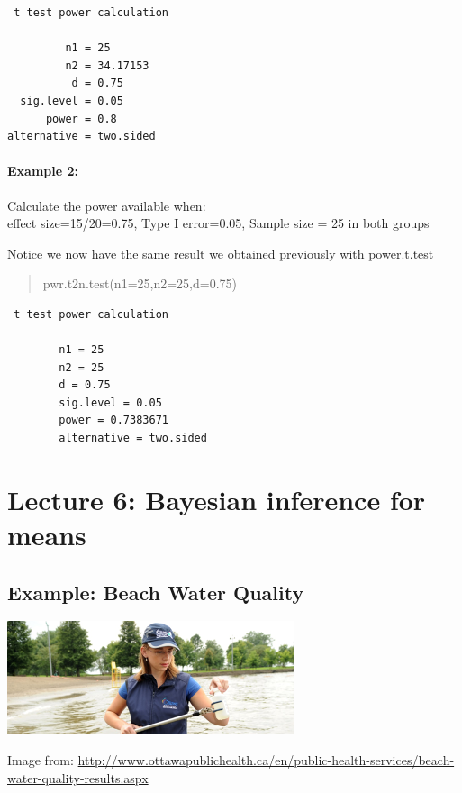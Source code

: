\documentclass[
]{book}
\begin{document}
\begin{verbatim}
 t test power calculation 

         n1 = 25
         n2 = 34.17153
          d = 0.75
  sig.level = 0.05
      power = 0.8
alternative = two.sided
\end{verbatim}

\hypertarget{example-2-2}{%
\subsubsection{Example 2:}\label{example-2-2}}

Calculate the power available when:\\
effect size=15/20=0.75, Type I error=0.05, Sample size = 25 in both groups

Notice we now have the same result we obtained previously with power.t.test

\begin{quote}
pwr.t2n.test(n1=25,n2=25,d=0.75)
\end{quote}

\begin{verbatim}
 t test power calculation 

        n1 = 25
        n2 = 25
        d = 0.75
        sig.level = 0.05
        power = 0.7383671
        alternative = two.sided
\end{verbatim}

\hypertarget{lecture-6-bayesian-inference-for-means}{%
\chapter{Lecture 6: Bayesian inference for means}\label{lecture-6-bayesian-inference-for-means}}

\hypertarget{example-beach-water-quality}{%
\section{Example: Beach Water Quality}\label{example-beach-water-quality}}

\includegraphics[width=0.5\linewidth]{./6_3}

Image from: \url{http://www.ottawapublichealth.ca/en/public-health-services/beach-water-quality-results.aspx}
\end{document}

